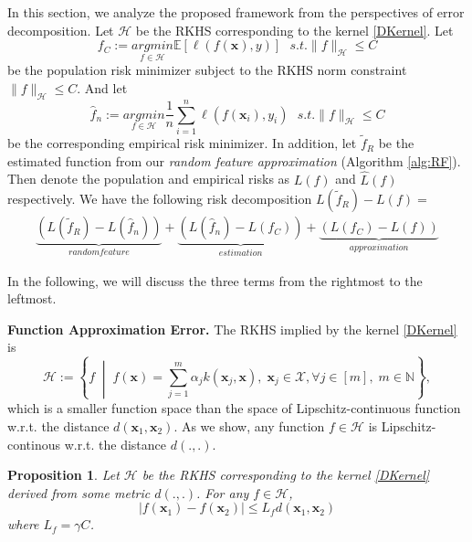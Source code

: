 \documentclass{article}
\newtheorem{proposition}{Proposition}
\newcommand{\E}{\mathbb{E}}
\newcommand{\X}{\mathcal{X}}
\newcommand{\1}{\mathbf{1}}
\newcommand{\bx}{\boldsymbol{x}}
\newcommand{\cH}{\mathcal{H}}
\newcommand{\hf}{\hat{f}}
\newcommand{\tf}{\tilde{f}}
\newcommand{\hL}{\hat{L}}
\begin{document}
In this section, we analyze the proposed framework from the perspectives of error decomposition. Let $\cH$ be the RKHS corresponding to the kernel \eqref{DKernel}. Let
\begin{equation}\label{risk_minimizer}
f_{C}:=\underset{f\in \cH}{argmin} \E[ \ell( f(\bx), y ) ] \ \ \
s.t.           \|f\|_{\cH}\leq C
\end{equation}
be the population risk minimizer subject to the RKHS norm constraint $\|f\|_{\cH}\leq C$. And let 
\begin{equation}\label{erm_minimizer}
\hf_{n}:=\underset{f\in \cH}{argmin} \frac{1}{n}\sum_{i=1}^n \ell( f(\bx_i), y_i )  \ \ \
s.t.           \|f\|_{\cH}\leq C
\end{equation}
be the corresponding empirical risk minimizer. In addition, let $\tf_R$ be the estimated function from our \emph{random feature approximation} (Algorithm \ref{alg:RF}). Then denote the population and empirical risks as $L(f)$ and $\hL(f)$ respectively. We have the following risk decomposition $L(\tf_R)-L(f)=$
\begin{equation*}
\begin{aligned}
\underbrace{(L(\tf_R)-L(\hf_n))}_{random feature} + \underbrace{(L(\hf_n)-L(f_C))}_{estimation} + \underbrace{(L(f_C)-L(f))}_{approximation}
\end{aligned}
\end{equation*}

In the following, we will discuss the three terms from the rightmost to the leftmost.

\textbf{Function Approximation Error.}
The RKHS implied by the kernel \eqref{DKernel} is 
\begin{equation*}
    \cH:=\left\{f \;\middle|\; f(\bx)=\sum_{j=1}^m \alpha_{j} k(\bx_j,\bx),\; \bx_j\in\X,\forall j\in [m],\; m \in \mathbb{N}\right\},
\end{equation*}
which is a smaller function space than the space of Lipschitz-continuous function w.r.t. the distance $d(\bx_1,\bx_2)$. As we show, any function $f\in\cH$ is Lipschitz-continous w.r.t. the distance $d(.,.)$.
\begin{proposition}\label{thm:RKHS_lip}
Let $\cH$ be the RKHS corresponding to the kernel \eqref{DKernel} derived from some metric $d(.,.)$. For any $f\in\cH$, 
$$
|f(\bx_1)-f(\bx_2)|\leq L_f d(\bx_1,\bx_2)
$$
where $L_f=\gamma C$.
\end{proposition}
\end{document}

